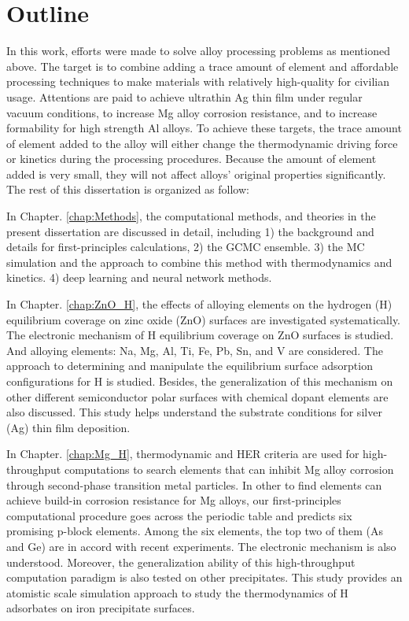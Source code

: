 \newpage
\section{Outline}


In this work, efforts were made to solve alloy processing problems as mentioned above. The target is to combine adding a trace amount of element and affordable processing techniques to make materials with relatively high-quality for civilian usage. Attentions are paid to achieve ultrathin Ag thin film under regular vacuum conditions, to increase Mg alloy corrosion resistance, and to increase formability for high strength Al alloys. To achieve these targets, the trace amount of element added to the alloy will either change the thermodynamic driving force or kinetics during the processing procedures. Because the amount of element added is very small, they will not affect alloys' original properties significantly. The rest of this dissertation is organized as follow:

In Chapter. \ref{chap:Methods}, the computational methods, and theories in the present dissertation are discussed in detail, including 1) the background and details for first-principles calculations, 2) the \acf{GCMC} ensemble. 3) the \acf{MC} simulation and the approach to combine this method with thermodynamics and kinetics. 4) deep learning and neural network methods.

In Chapter. \ref{chap:ZnO_H}, the effects of alloying elements on the hydrogen (H) equilibrium coverage on zinc oxide (ZnO) surfaces are investigated systematically. The electronic mechanism of H equilibrium coverage on ZnO surfaces is studied. And alloying elements: Na, Mg, Al, Ti, Fe, Pb, Sn, and V are considered. The approach to determining and manipulate the equilibrium surface adsorption configurations for H is studied. Besides, the generalization of this mechanism on other different semiconductor polar surfaces with chemical dopant elements are also discussed. This study helps understand the substrate conditions for silver (Ag) thin film deposition.

In Chapter. \ref{chap:Mg_H}, thermodynamic and \acf{HER} criteria are used for high-throughput computations to search elements that can inhibit Mg alloy corrosion through second-phase transition metal particles. In other to find elements can achieve build-in corrosion resistance for Mg alloys, our first-principles computational procedure goes across the periodic table and predicts six promising p-block elements. Among the six elements, the top two of them (As and Ge) are in accord with recent experiments. The electronic mechanism is also understood. Moreover, the generalization ability of this high-throughput computation paradigm is also tested on other precipitates. This study provides an atomistic scale simulation approach to study the thermodynamics of H adsorbates on iron precipitate surfaces.

